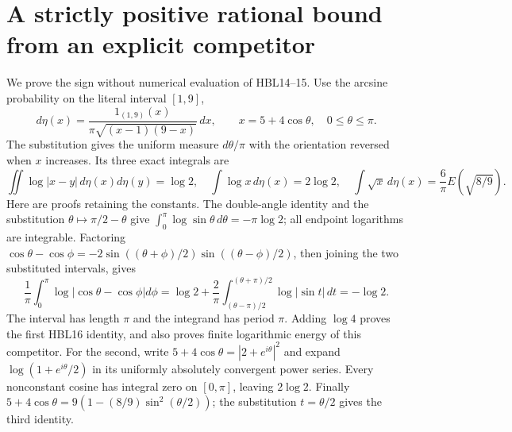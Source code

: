 \documentclass[11pt,a4paper]{article}
\begin{document}
\section{A strictly positive rational bound from an explicit competitor}

We prove the sign without numerical evaluation of HBL14--15. Use the
arcsine probability on the literal interval $[1,9]$,
\[
 d\eta(x)=\frac{1_{(1,9)}(x)}{\pi\sqrt{(x-1)(9-x)}}\,dx,
 \qquad x=5+4\cos\theta,\quad 0\le\theta\le\pi.
\]
The substitution gives the uniform measure $d\theta/\pi$ with the
orientation reversed when $x$ increases. Its three exact integrals are
\[
 \iint\log|x-y|\,d\eta(x)d\eta(y)=\log2,\quad
 \int\log x\,d\eta(x)=2\log2,\quad
 \int\sqrt x\,d\eta(x)=\frac6\pi E(\sqrt{8/9}).
 \tag{HBL16}
\]
Here are proofs retaining the constants. The double-angle identity and
the substitution $\theta\mapsto\pi/2-\theta$ give
$\int_0^\pi\log\sin\theta\,d\theta=-\pi\log2$; all endpoint
logarithms are integrable. Factoring
$\cos\theta-\cos\phi=-2\sin((\theta+\phi)/2)
\sin((\theta-\phi)/2)$, then joining the two substituted intervals,
gives
\[
 \frac1\pi\int_0^\pi\log|\cos\theta-\cos\phi|d\phi
 =\log2+\frac2\pi\int_{(\theta-\pi)/2}^{(\theta+\pi)/2}
                              \log|\sin t|\,dt=-\log2.
\]
The interval has length $\pi$ and the integrand has period $\pi$.
Adding $\log4$ proves the first HBL16 identity, and also proves finite
logarithmic energy of this competitor. For the second, write
$5+4\cos\theta=|2+e^{i\theta}|^2$ and expand
$\log(1+e^{i\theta}/2)$ in its uniformly absolutely convergent power
series. Every nonconstant cosine has integral zero on $[0,\pi]$,
leaving $2\log2$. Finally
$5+4\cos\theta=9(1-(8/9)\sin^2(\theta/2))$; the substitution
$t=\theta/2$ gives the third identity.
\end{document}

